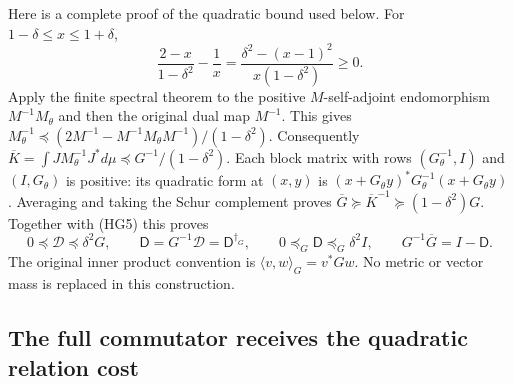 \documentclass{article}
\begin{document}
Here is a complete proof of the quadratic bound used below. For
$1-\delta\le x\le1+\delta$,
\[
 \frac{2-x}{1-\delta^2}-\frac1x
 =\frac{\delta^2-(x-1)^2}{x(1-\delta^2)}\ge0 .
 \tag{HG6}
\]
Apply the finite spectral theorem to the positive $M$-self-adjoint
endomorphism $M^{-1}M_\theta$ and then the original dual map $M^{-1}$.
This gives
$M_\theta^{-1}\preceq
(2M^{-1}-M^{-1}M_\theta M^{-1})/(1-\delta^2)$.
Consequently $\overline K=\int JM_\theta^{-1}J^*d\mu
\preceq G^{-1}/(1-\delta^2)$.
Each block matrix with rows $(G_\theta^{-1},I)$ and $(I,G_\theta)$
is positive: its quadratic form at $(x,y)$ is
$(x+G_\theta y)^*G_\theta^{-1}(x+G_\theta y)$.
Averaging and taking the Schur complement proves
$\overline G\succeq\overline K^{-1}\succeq(1-\delta^2)G$.
Together with (HG5) this proves
\[
 0\preceq\mathscr D\preceq\delta^2G,\qquad
 \mathsf D=G^{-1}\mathscr D=\mathsf D^{\dagger_G},\qquad
 0\preceq_G\mathsf D\preceq_G\delta^2I,\qquad
 G^{-1}\overline G=I-\mathsf D .
 \tag{HG7}
\]
The original inner product convention is $\langle v,w\rangle_G=v^*Gw$.
No metric or vector mass is replaced in this construction.

\subsection{The full commutator receives the quadratic relation cost}
\end{document}
